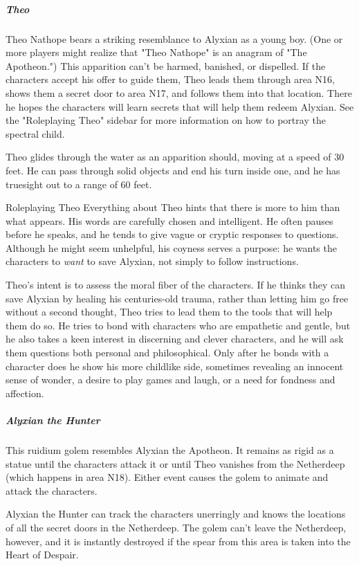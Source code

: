 \documentclass[10pt,a4paper,twoside,bg=print,twocolumn,openany,nodeprecatedcode]{dndbook}
\begin{document}
\subparagraph{Theo}
Theo Nathope bears a striking resemblance to Alyxian as a young boy. (One or more players might realize that "Theo Nathope" is an anagram of "The Apotheon.") This apparition can't be harmed, banished, or dispelled. If the characters accept his offer to guide them, Theo leads them through area N16, shows them a secret door to area N17, and follows them into that location. There he hopes the characters will learn secrets that will help them redeem Alyxian. See the "Roleplaying Theo" sidebar for more information on how to portray the spectral child.

Theo glides through the water as an apparition should, moving at a speed of 30 feet. He can pass through solid objects and end his turn inside one, and he has truesight out to a range of 60 feet.

\begin{DndSidebar}[float=!b]{Roleplaying Theo}
Everything about Theo hints that there is more to him than what appears. His words are carefully chosen and intelligent. He often pauses before he speaks, and he tends to give vague or cryptic responses to questions. Although he might seem unhelpful, his coyness serves a purpose: he wants the characters to \textit{want} to save Alyxian, not simply to follow instructions.



Theo's intent is to assess the moral fiber of the characters. If he thinks they can save Alyxian by healing his centuries-old trauma, rather than letting him go free without a second thought, Theo tries to lead them to the tools that will help them do so. He tries to bond with characters who are empathetic and gentle, but he also takes a keen interest in discerning and clever characters, and he will ask them questions both personal and philosophical. Only after he bonds with a character does he show his more childlike side, sometimes revealing an innocent sense of wonder, a desire to play games and laugh, or a need for fondness and affection.



\end{DndSidebar}

\subparagraph{Alyxian the Hunter}
This ruidium golem resembles Alyxian the Apotheon. It remains as rigid as a statue until the characters attack it or until Theo vanishes from the Netherdeep (which happens in area N18). Either event causes the golem to animate and attack the characters.

Alyxian the Hunter can track the characters unerringly and knows the locations of all the secret doors in the Netherdeep. The golem can't leave the Netherdeep, however, and it is instantly destroyed if the spear from this area is taken into the Heart of Despair.
\end{document}
